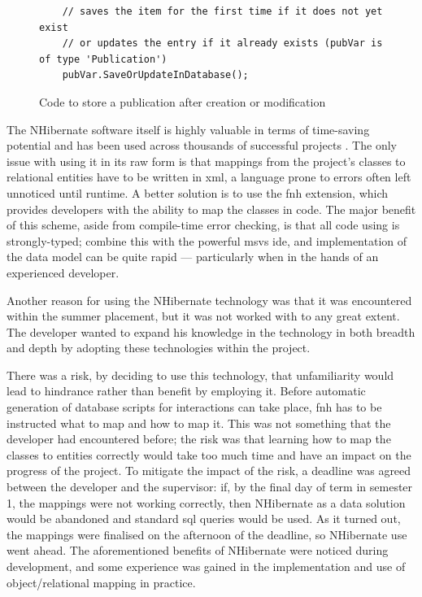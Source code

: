 \begin{figure}
	\begin{center}
			\lstset{language=CSharp} 
			\begin{lstlisting}
	// saves the item for the first time if it does not yet exist
	// or updates the entry if it already exists (pubVar is of type 'Publication')
	pubVar.SaveOrUpdateInDatabase();
			\end{lstlisting}
		\caption{Code to store a publication after creation or modification}
		\label{fig:storePublication}
	\end{center}
\end{figure}

The NHibernate software itself is highly valuable in terms of time-saving potential and has been used across thousands of successful projects \cite{NhUse}.  The only issue with using it in its raw form is that mappings from the project's classes to relational entities have to be written in \gls{xml}, a language prone to errors often left unnoticed until runtime.  A better solution is to use the \gls{fnh} extension, which provides developers with the ability to map the classes in code.  The major benefit of this scheme, aside from compile-time error checking, is that all code using is strongly-typed; combine this with the powerful \gls{msvs} \gls{ide}, and implementation of the data model can be quite rapid --- particularly when in the hands of an experienced developer.

Another reason for using the NHibernate technology was that it was encountered within the summer placement, but it was not worked with to any great extent.  The developer wanted to expand his knowledge in the technology in both breadth and depth by adopting these technologies within the project.

There was a risk, by deciding to use this technology, that unfamiliarity would lead to hindrance rather than benefit by employing it.  Before automatic generation of database scripts for interactions can take place, \gls{fnh} has to be instructed what to map and how to map it.  This was not something that the developer had encountered before; the risk was that learning how to map the classes to entities correctly would take too much time and have an impact on the progress of the project.  To mitigate the impact of the risk, a deadline was agreed between the developer and the supervisor: if, by the final day of term in semester 1, the mappings were not working correctly, then NHibernate as a data solution would be abandoned and standard \gls{sql} queries would be used.  As it turned out, the mappings were finalised on the afternoon of the deadline, so NHibernate use went ahead.  The aforementioned benefits of NHibernate were noticed during development, and some experience was gained in the implementation and use of object/relational mapping in practice.

